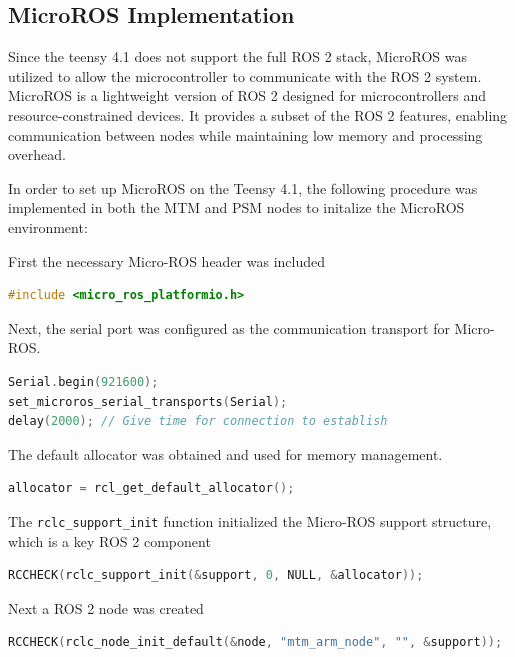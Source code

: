 \subsection{MicroROS Implementation}

Since the teensy 4.1 does not support the full ROS 2 stack, MicroROS was utilized to allow the microcontroller to communicate with the ROS 2 system. MicroROS is a lightweight version of ROS 2 designed for microcontrollers and resource-constrained devices. It provides a subset of the ROS 2 features, enabling communication between nodes while maintaining low memory and processing overhead. 

In order to set up MicroROS on the Teensy 4.1, the following procedure was implemented in both the MTM and PSM nodes to initalize the MicroROS environment:

First the necessary Micro-ROS header was included
\begin{lstlisting}[language=C++, caption={Include Micro-ROS PlatformIO Header}, label={lst:microros_include}]
#include <micro_ros_platformio.h>
\end{lstlisting}

Next, the serial port was configured as the communication transport for Micro-ROS.

\begin{lstlisting}[language=C++, caption={Set Micro-ROS Serial Transport}, label={lst:microros_serial_transport}]
Serial.begin(921600);
set_microros_serial_transports(Serial);
delay(2000); // Give time for connection to establish
\end{lstlisting}

The default allocator was obtained and used for memory management.
\begin{lstlisting}[language=C++, caption={Initialize Micro-ROS Allocator}, label={lst:microros_allocator}]
allocator = rcl_get_default_allocator();
\end{lstlisting}

The \texttt{rclc\_support\_init} function initialized the Micro-ROS support structure, which is a key ROS 2 component
\begin{lstlisting}[language=C++, caption={Initialize Micro-ROS Support Structure}, label={lst:microros_support_init}]
RCCHECK(rclc_support_init(&support, 0, NULL, &allocator));
\end{lstlisting}

Next a ROS 2 node was created 
\begin{lstlisting}[language=C++, caption={Initialize ROS 2 Node}, label={lst:microros_node_init}]
RCCHECK(rclc_node_init_default(&node, "mtm_arm_node", "", &support));
\end{lstlisting}

